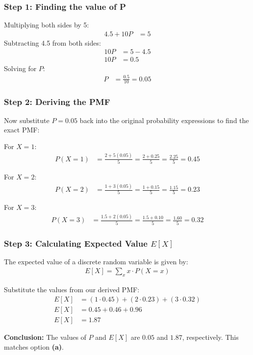 \documentclass{beamer}
\begin{document}
\begin{frame}
    \frametitle{Step 1: Finding the value of P }
    Multiplying both sides by 5:
    \begin{align}
        4.5 + 10P &= 5
    \end{align}
    Subtracting 4.5 from both sides:
    \begin{align}
        10P &= 5 - 4.5 \\
        10P &= 0.5
    \end{align}
    Solving for $P$:
    \begin{align}
        P &= \frac{0.5}{10} = \mathbf{0.05}
    \end{align}
\end{frame}

\begin{frame}
    \frametitle{Step 2: Deriving the PMF}
    Now substitute $P = 0.05$ back into the original probability expressions to find the exact PMF:
    
    \vspace{0.3cm}
    For $X = 1$:
    \begin{align}
        P(X=1) &= \frac{2 + 5(0.05)}{5} = \frac{2 + 0.25}{5} = \frac{2.25}{5} = \mathbf{0.45}
    \end{align}
    
    For $X = 2$:
    \begin{align}
        P(X=2) &= \frac{1 + 3(0.05)}{5} = \frac{1 + 0.15}{5} = \frac{1.15}{5} = \mathbf{0.23}
    \end{align}
    
    For $X = 3$:
    \begin{align}
        P(X=3) &= \frac{1.5 + 2(0.05)}{5} = \frac{1.5 + 0.10}{5} = \frac{1.60}{5} = \mathbf{0.32}
    \end{align}
\end{frame}

\begin{frame}
    \frametitle{Step 3: Calculating Expected Value $E[X]$}
    The expected value of a discrete random variable is given by:
    \begin{align}
        E[X] = \sum_{x} x \cdot P(X=x)
    \end{align}
    
    Substitute the values from our derived PMF:
    \begin{align}
        E[X] &= (1 \cdot 0.45) + (2 \cdot 0.23) + (3 \cdot 0.32) \\
        E[X] &= 0.45 + 0.46 + 0.96 \\
        E[X] &= \mathbf{1.87}
    \end{align}
    
    \vspace{0.3cm}
    \textbf{Conclusion:}
    The values of $P$ and $E[X]$ are $0.05$ and $1.87$, respectively. This matches option \textbf{(a)}.
\end{frame}
\end{document}
